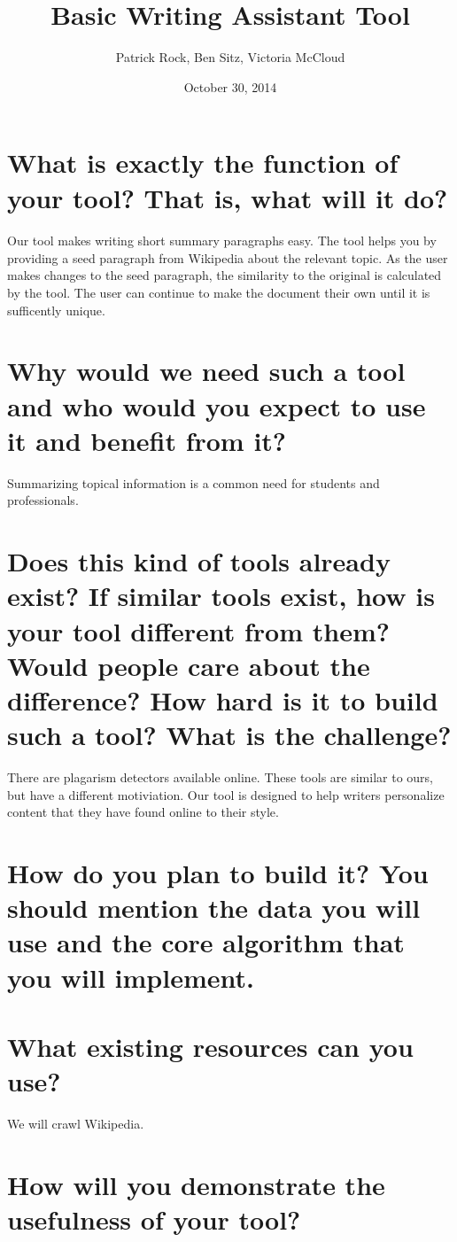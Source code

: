\documentclass{article}
\title{Basic Writing Assistant Tool}
\author{Patrick Rock, Ben Sitz, Victoria McCloud}
\date{October 30, 2014}
\begin{document}
\maketitle

\section{What is exactly the function of your tool? That is, what will it do?}
\paragraph{}
Our tool makes writing short summary paragraphs easy. The tool helps you by providing a seed paragraph from Wikipedia about the relevant topic.
As the user makes changes to the seed paragraph, the similarity to the original is calculated by the tool. The user can continue to make the 
document their own until it is sufficently unique.

\section{Why would we need such a tool and who would you expect to use it and benefit from it?}
Summarizing topical information is a common need for students and professionals. 

\section{Does this kind of tools already exist? If similar tools exist, how is your tool different from them? Would people care about the difference? How hard is it to build such a tool? What is the challenge?}
There are plagarism detectors available online. These tools are similar to ours, but have a different motiviation. Our tool is designed to help writers
personalize content that they have found online to their style. 

\section{How do you plan to build it? You should mention the data you will use and the core algorithm that you will implement.}

\section{What existing resources can you use?}
We will crawl Wikipedia.

\section{How will you demonstrate the usefulness of your tool?}
\end{document}
